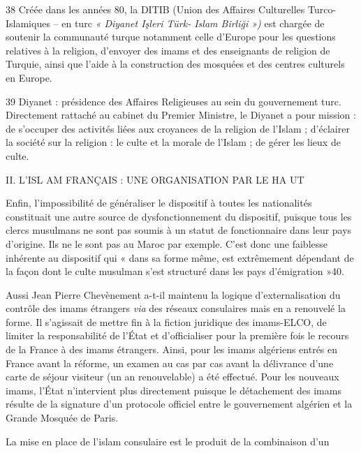 38 Créée dans les années 80, la DITIB (Union des Affaires Culturelles
Turco-Islamiques -- en turc \emph{« Diyanet Işleri Türk- Islam Birliği
»)} est chargée de soutenir la communauté turque notamment celle
d'Europe pour les questions relatives à la religion, d'envoyer des imams
et des enseignants de religion de Turquie, ainsi que l'aide à la
construction des mosquées et des centres culturels en Europe.

39 Diyanet : présidence des Affaires Religieuses au sein du gouvernement
turc. Directement rattaché au cabinet du Premier Ministre, le Diyanet a
pour mission : de s'occuper des activités liées aux croyances de la
religion de l'Islam ; d'éclairer la société sur la religion : le culte
et la morale de l'Islam ; de gérer les lieux de culte.

II. L'ISL AM FRANÇAIS : UNE ORGANISATION PAR LE HA UT

Enfin, l'impossibilité de généraliser le dispositif à toutes les
nationalités constituait une autre source de dysfonctionnement du
dispositif, puisque tous les clercs musulmans ne sont pas soumis à un
statut de fonctionnaire dans leur pays d'origine. Ils ne le sont pas au
Maroc par exemple. C'est donc une faiblesse inhérente au dispositif qui
« dans sa forme même, est extrêmement dépendant de la façon dont le
culte musulman s'est structuré dans les pays d'émigration »40.

Aussi Jean Pierre Chevènement a-t-il maintenu la logique
d'externalisation du contrôle des imams étrangers \emph{via} des réseaux
consulaires mais en a renouvelé la forme. Il s'agissait de mettre fin à
la fiction juridique des imams-ELCO, de limiter la responsabilité de
l'État et d'officialiser pour la première fois le recours de la France à
des imams étrangers. Ainsi, pour les imams algériens entrés en France
avant la réforme, un examen au cas par cas avant la délivrance d'une
carte de séjour visiteur (un an renouvelable) a été effectué. Pour les
nouveaux imams, l'État n'intervient plus directement puisque le
détachement des imams résulte de la signature d'un protocole officiel
entre le gouvernement algérien et la Grande Mosquée de Paris.

La mise en place de l'islam consulaire est le produit de la combinaison
d'un

